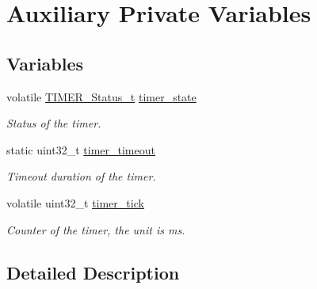 \hypertarget{group___k_n_x___aux___private___variables}{}\section{Auxiliary Private Variables}
\label{group___k_n_x___aux___private___variables}
\subsection*{Variables}
\begin{DoxyCompactItemize}
\item 
volatile \hyperlink{group___k_n_x___aux___exported___types_ga6ed3d972c6c5995cb3fe41995f121b41}{T\+I\+M\+E\+R\+\_\+\+Status\+\_\+t} \hyperlink{group___k_n_x___aux___private___variables_ga23c914a3038b7651aeb6bc1f444fe805}{timer\+\_\+state}\hypertarget{group___k_n_x___aux___private___variables_ga23c914a3038b7651aeb6bc1f444fe805}{}\label{group___k_n_x___aux___private___variables_ga23c914a3038b7651aeb6bc1f444fe805}

\begin{DoxyCompactList}\small\item\em Status of the timer. \end{DoxyCompactList}\item 
static uint32\+\_\+t \hyperlink{group___k_n_x___aux___private___variables_ga9425be3f8a3c77c3e1f30e8759fc65e8}{timer\+\_\+timeout}\hypertarget{group___k_n_x___aux___private___variables_ga9425be3f8a3c77c3e1f30e8759fc65e8}{}\label{group___k_n_x___aux___private___variables_ga9425be3f8a3c77c3e1f30e8759fc65e8}

\begin{DoxyCompactList}\small\item\em Timeout duration of the timer. \end{DoxyCompactList}\item 
volatile uint32\+\_\+t \hyperlink{group___k_n_x___aux___private___variables_ga8c702713be164664bf7d3c5f9cc9002d}{timer\+\_\+tick}\hypertarget{group___k_n_x___aux___private___variables_ga8c702713be164664bf7d3c5f9cc9002d}{}\label{group___k_n_x___aux___private___variables_ga8c702713be164664bf7d3c5f9cc9002d}

\begin{DoxyCompactList}\small\item\em Counter of the timer, the unit is ms. \end{DoxyCompactList}\end{DoxyCompactItemize}


\subsection{Detailed Description}
